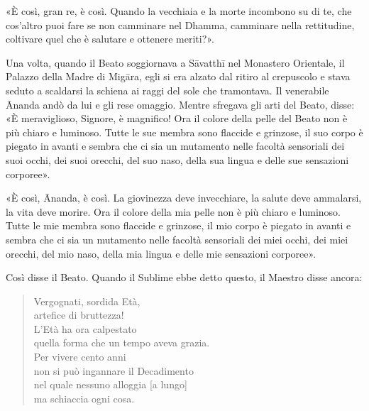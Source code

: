 «È così, gran re, è così. Quando la vecchiaia e la morte incombono su di
te, che cos’altro puoi fare se non camminare nel Dhamma, camminare nella
rettitudine, coltivare quel che è salutare e ottenere meriti?».




Una volta, quando il Beato soggiornava a Sāvatthī nel Monastero
Orientale, il Palazzo della Madre di Migāra, egli si era alzato dal
ritiro al crepuscolo e stava seduto a scaldarsi la schiena ai raggi del
sole che tramontava. Il venerabile Ānanda andò da lui e gli rese
omaggio. Mentre sfregava gli arti del Beato, disse: «È meraviglioso,
Signore, è magnifico! Ora il colore della pelle del Beato non è più
chiaro e luminoso. Tutte le sue membra sono flaccide e grinzose, il suo
corpo è piegato in avanti e sembra che ci sia un mutamento nelle facoltà
sensoriali dei suoi occhi, dei suoi orecchi, del suo naso, della sua
lingua e delle sue sensazioni corporee».


«È così, Ānanda, è così. La giovinezza deve invecchiare, la salute deve
ammalarsi, la vita deve morire. Ora il colore della mia pelle non è più
chiaro e luminoso. Tutte le mie membra sono flaccide e grinzose, il mio
corpo è piegato in avanti e sembra che ci sia un mutamento nelle facoltà
sensoriali dei miei occhi, dei miei orecchi, del mio naso, della mia
lingua e delle mie sensazioni corporee».


Così disse il Beato. Quando il Sublime ebbe detto questo, il Maestro
disse ancora:


\begin{quote}
Vergognati, sordida Età, \\
artefice di bruttezza! \\
L’Età ha ora calpestato \\
quella forma che un tempo aveva grazia. \\
Per vivere cento anni \\
non si può ingannare il Decadimento \\
nel quale nessuno alloggia [a lungo] \\
ma schiaccia ogni cosa.
\end{quote}



